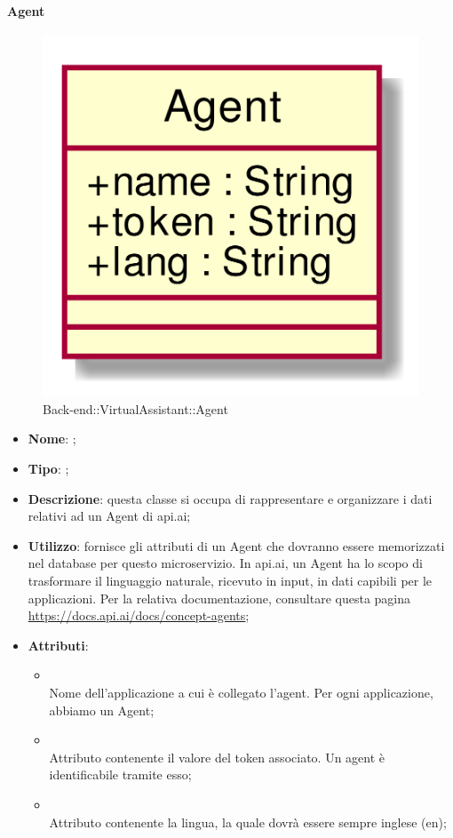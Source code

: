 \hypertarget{Agent_label}{\paragraph{Agent}}
\begin{figure}[h]
	\centering
	\includegraphics[width=\textwidth,height=\textheight,keepaspectratio]{images/ClassAgent.png}
	\caption{Back-end::VirtualAssistant::Agent}
\end{figure}
\begin{itemize}
	\item \textbf{Nome}: ;
	\item \textbf{Tipo}: ;
	\item \textbf{Descrizione}: questa classe si occupa di rappresentare e organizzare i dati relativi ad un Agent di api.ai;
	\item \textbf{Utilizzo}: fornisce gli attributi di un Agent che dovranno essere memorizzati nel database per questo microservizio.
In api.ai, un Agent ha lo scopo di trasformare il linguaggio naturale, ricevuto in input, in dati capibili per le applicazioni.
Per la relativa documentazione, consultare questa pagina \url{https://docs.api.ai/docs/concept-agents};
	\item \textbf{Attributi}:
	\begin{itemize}
		\item[]  \\
		Nome dell'applicazione a cui è collegato l'agent.
Per ogni applicazione, abbiamo un Agent;
		\item[]  \\
		Attributo contenente il valore del token associato. Un agent è identificabile tramite esso;
		\item[]  \\
		Attributo contenente la lingua, la quale dovrà essere sempre inglese (en);
	\end{itemize}
\end{itemize}

